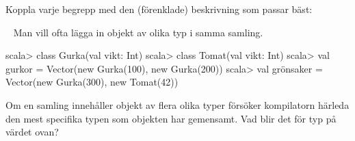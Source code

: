 

\ifPreSolution

\Exercise{\ExeWeekNINE}\label{exe:W09}

\begin{Goals}

\end{Goals}

\begin{Preparations}
\item {}
\end{Preparations}

\BasicTasks

\else

\ExerciseSolution{\ExeWeekNINE}

\BasicTasks

\fi




\QUESTBEGIN

\Task \what

\vspace{1em}\noindent Koppla varje begrepp med den (förenklade) beskrivning som passar bäst:

\begin{ConceptConnections}

\end{ConceptConnections}

\SOLUTION

\TaskSolved \what

\begin{ConceptConnections}

\end{ConceptConnections}

\QUESTEND






\QUESTBEGIN

\Task  \what~  Man vill ofta lägga in objekt av olika typ i samma samling.
\begin{REPL}
scala> class Gurka(val vikt: Int)
scala> class Tomat(val vikt: Int)
scala> val gurkor = Vector(new Gurka(100), new Gurka(200))
scala> val grönsaker = Vector(new Gurka(300), new Tomat(42))
\end{REPL}
\Subtask Om en samling innehåller objekt av flera olika typer försöker kompilatorn härleda den mest specifika typen som objekten har gemensamt. Vad blir det för typ på värdet  ovan?

